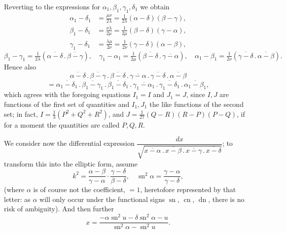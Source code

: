 \documentclass[11pt,a4paper]{article}
\providecommand{\sn}{\operatorname{sn}}
\providecommand{\cn}{\operatorname{cn}}
\providecommand{\dn}{\operatorname{dn}}
\begin{document}
Reverting to the expressions for $\alpha_{1}, \beta_{1}, \gamma_{1}, \delta_{1}$ we obtain
\[
\begin{aligned}
\alpha_{1} - \delta_{1} &= \frac{\mu\nu}{2\lambda} = \tfrac{1}{2\lambda}(\alpha - \delta)(\beta - \gamma),\\
\beta_{1} - \delta_{1} &= \frac{\nu\lambda}{2\mu} = \tfrac{1}{2\mu}(\beta - \delta)(\gamma - \alpha),\\
\gamma_{1} - \delta_{1} &= \frac{\lambda\mu}{2\nu} = \tfrac{1}{2\nu}(\gamma - \delta)(\alpha - \beta),
\end{aligned}
\]
\[
\beta_{1} - \gamma_{1} = \tfrac{1}{2\lambda}(\overline{\alpha - \delta}\,.\,\overline{\beta - \gamma}), \quad \gamma_{1} - \alpha_{1} = \tfrac{1}{2\mu}(\overline{\beta - \delta}\,.\,\overline{\gamma - \alpha}), \quad \alpha_{1} - \beta_{1} = \tfrac{1}{2\nu}(\overline{\gamma - \delta}\,.\,\overline{\alpha - \beta}).
\]
Hence also
\[
\overline{\alpha - \delta}\,.\,\overline{\beta - \gamma}\,.\,\overline{\beta - \delta}\,.\,\overline{\gamma - \alpha}\,.\,\overline{\gamma - \delta}\,.\,\overline{\alpha - \beta}
\]
\[
= \overline{\alpha_{1} - \delta_{1}}\,.\,\overline{\beta_{1} - \gamma_{1}}\,.\,\overline{\beta_{1} - \delta_{1}}\,.\,\overline{\gamma_{1} - \alpha_{1}}\,.\,\overline{\gamma_{1} - \delta_{1}}\,.\,\overline{\alpha_{1} - \beta_{1}},
\]
which agrees with the foregoing equations $I_{1} = I$ and $J_{1} = J$, since $I, J$ are functions of the first set of quantities and $I_{1}, J_{1}$ the like functions of the second set; in fact, $I = \tfrac{1}{3}(P^{2} + Q^{2} + R^{2})$, and $J = \tfrac{1}{27}(Q - R)(R - P)(P - Q)$, if for a moment the quantities are called $P, Q, R$.

\newpage


We consider now the differential expression $\dfrac{dx}{\sqrt{\overline{x - \alpha}\,.\,\overline{x - \beta}\,.\,\overline{x - \gamma}\,.\,\overline{x - \delta}}}$; to transform this into the elliptic form, assume
\[
k^{2} = \frac{\alpha - \beta}{\gamma - \alpha}\cdot\frac{\gamma - \delta}{\beta - \delta}, \quad \sn^{2}\alpha = \frac{\gamma - \alpha}{\gamma - \delta},
\]
(where $\alpha$ is of course not the coefficient, $= 1$, heretofore represented by that letter: as $\alpha$ will only occur under the functional signs $\sn$, $\cn$, $\dn$, there is no risk of ambiguity). And then further
\[
x = \frac{-\alpha \sn^{2} u - \delta \sn^{2}\alpha - u}{\sn^{2}\alpha - \sn^{2} u}.
\]
\end{document}
